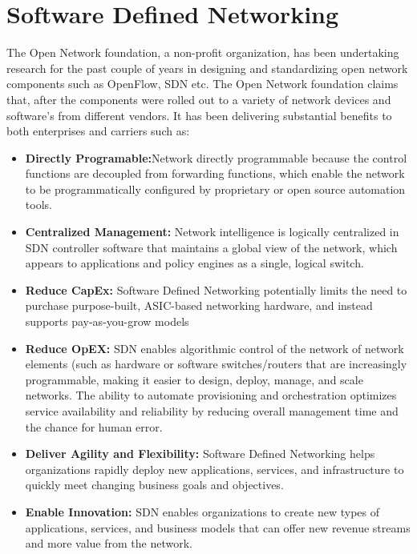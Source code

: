 
\chapter{Software Defined Networking}\label{ch:software_defined_networking}
\sffamily{}
The Open Network foundation, a non-profit organization, has been undertaking research for the past couple of years in designing and standardizing open network components such as OpenFlow, SDN etc. The Open Network foundation claims that, after the components were rolled out to a variety of network devices and software’s from different vendors. It has been delivering substantial benefits to both enterprises and carriers such as: \cite{What_is_SDN}

\begin{itemize}
	\item \textbf{Directly Programable:}Network directly programmable because the control functions are decoupled from forwarding functions, which enable the network to be programmatically configured by proprietary or open source automation tools.
	\item \textbf{Centralized Management:} Network intelligence is logically centralized in SDN controller software that maintains a global view of the network, which appears to applications and policy engines as a single, logical switch.
	\item \textbf{Reduce CapEx:} Software Defined Networking potentially limits the need to purchase purpose-built, ASIC-based networking hardware, and instead supports pay-as-you-grow models
	\item \textbf{Reduce OpEX:} SDN enables algorithmic control of the network of network elements (such as hardware or software switches/routers that are increasingly programmable, making it easier to design, deploy, manage, and scale networks. The ability to automate provisioning and orchestration optimizes service availability and reliability by reducing overall management time and the chance for human error.
	\item \textbf{Deliver Agility and Flexibility:} Software Defined Networking helps organizations rapidly deploy new applications, services, and infrastructure to quickly meet changing business goals and objectives.
	\item \textbf{Enable Innovation:} SDN enables organizations to create new types of applications, services, and business models that can offer new revenue streams and more value from the network.
	
\end{itemize}
